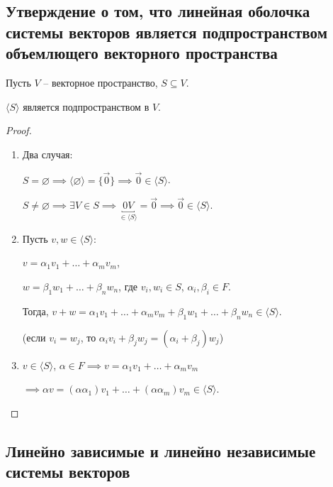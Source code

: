 \subsection{Утверждение о том, что линейная оболочка системы векторов является подпространством объемлющего векторного пространства}

Пусть $V$ -- векторное пространство, $S \subseteq V$.

\begin{proposal}
    $\langle S \rangle$ является подпространством в $V$.
\end{proposal}

\begin{proof}~
    \begin{enumerate}
    \item 
        Два случая:

        $S = \varnothing \implies \langle \varnothing \rangle = \{\overrightarrow{0}\} \implies \overrightarrow{0} \in \langle S \rangle$.

        $S \neq \varnothing \implies \exists V \in S \implies \underbracket{0 V}_{\in \langle S \rangle} = \overrightarrow{0} \implies \overrightarrow{0} \in \langle S \rangle$.

    \item 
        Пусть $v, w \in \langle S \rangle$:

        $v = \alpha_1 v_1 + \dots + \alpha_m v_m$,

        $w = \beta_1 w_1 + \dots + \beta_n w_n$, где $v_i, w_i \in S$, $\alpha_i, \beta_i \in F$.

        Тогда, $v + w = \alpha_1 v_1 + \dots + \alpha_m v_m + \beta_1 w_1 + \dots + \beta_n w_n \in \langle S \rangle$.

        (если $v_i = w_j$, то $\alpha_i v_i + \beta_j w_j = (\alpha_i + \beta_j) w_j$)

    \item
        $v \in \langle S \rangle$, $\alpha \in F \implies v = \alpha_1 v_1 + \dots + \alpha_m v_m$

        $\implies \alpha v = (\alpha \alpha_1) v_1 + \dots + (\alpha \alpha_m) v_m \in \langle S \rangle$. \qedhere
    \end{enumerate}
\end{proof}


\subsection{Линейно зависимые и линейно независимые системы векторов}

